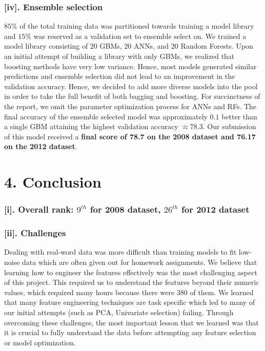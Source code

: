 \subsubsection*{[iv]. Ensemble selection}
$85\%$ of the total training data was partitioned towards training a model library and $15\%$ was reserved as a validation set to ensemble select on. We trained a model library consisting of $20$ GBMs, $20$ ANNs, and $20$ Random Forests. Upon an initial attempt of building a library with only GBMs, we realized that boosting methods have very low variance. Hence, most models generated similar predictions and ensemble selection did not lead to an improvement in the validation accuracy. Hence, we decided to add more diverse models into the pool in order to take the full benefit of both bagging and boosting. For succinctness of the report, we omit the parameter optimization process for ANNs and RFs. The final accuracy of the ensemble selected model was approximately $0.1$ better than a single GBM attaining the highest validation accuracy $\approx 78.3$. Our submission of this model received a \textbf{final score of 78.7 on the 2008 dataset and 76.17 on the 2012 dataset}.

\newpage

\section*{4. Conclusion}
\subsubsection*{[i]. Overall rank: $9^{th}$ for 2008 dataset, $26^{th}$ for 2012 dataset}

\subsubsection*{[ii]. Challenges}
Dealing with real-word data was more difficult than training models to fit low-noise data which are often given out for homework assignments. We believe that learning how to engineer the features effectively was the most challenging aspect of this project. This required us to understand the features beyond their numeric values, which required many hours because there were 380 of them. We learned that many feature engineering techniques are task specific which led to many of our initial attempts (such as PCA, Univariate selection) failing. Through overcoming these challenges, the most important lesson that we learned was that it is crucial to fully understand the data before attempting any feature selection or model optimization.

